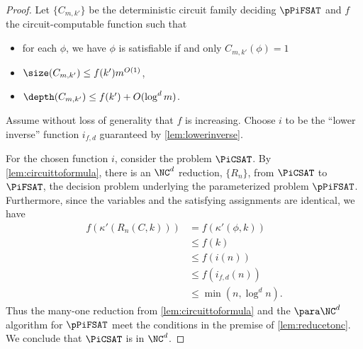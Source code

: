 \begin{proof}
  Let $\{C_{m, k'}\}$ be the deterministic circuit family deciding $\pPiFSAT$ and $f$ the circuit-computable function such that
  \begin{itemize}
  \item for each $\phi$, we have $\phi$ is satisfiable if and only $C_{m, k'}(\phi) = 1$
  \item $\size(C_{m, k'}) \leq f(k') m^{O(1)}$,
  \item $\depth(C_{m, k'}) \leq f(k') + O(\log^d m)$.
  \end{itemize}
  Assume without loss of generality that $f$ is increasing.
  Choose $i$ to be the ``lower inverse'' function $i_{f, d}$ guaranteed by \autoref{lem:lowerinverse}.

  For the chosen function $i$, consider the problem $\PiCSAT$.
  By \autoref{lem:circuittoformula}, there is an $\NC^d$ reduction, $\{R_n\}$, from $\PiCSAT$ to $\PiFSAT$, the decision problem underlying the parameterized problem $\pPiFSAT$.
  Furthermore, since the variables and the satisfying assignments are identical, we have
  \begin{align*}
    f(\kappa'(R_n(C, k))) & = f(\kappa'(\phi, k)) \\
    & \leq f(k) \\
    & \leq f(i(n)) \\
    & \leq f(i_{f, d}(n)) \\
    & \leq \min(n, \log^d n).
  \end{align*}
  Thus the many-one reduction from \autoref{lem:circuittoformula} and the $\para \NC^d$ algorithm for $\pPiFSAT$ meet the conditions in the premise of \autoref{lem:reducetonc}.
  We conclude that $\PiCSAT$ is in $\NC^d$.
\end{proof}
